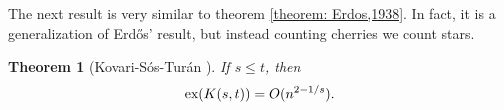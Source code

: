 \documentclass[12pt,twoside,a4paper]{book}
\numberwithin{equation}{section}
\newtheorem{theorem}             {Theorem}[section]
\newtheorem{corollary}	[theorem] {Corollary}
\theoremstyle{remark}
\def\ex{\mathop{\text{\rm ex}}\nolimits}
\begin{document}



The next result is very similar to theorem \ref{theorem: Erdos,1938}. In fact, it is a generalization of Erd\H{o}s' result, but instead counting cherries we count stars.
\begin{theorem}[{Kovari-Sós-Turán \cite{KoSoTu54}}]
If $s \leq t$, then
$$ \ex(K(s,t)) = O (n^{2 - 1/s}). $$
\end{theorem}
\end{document}
